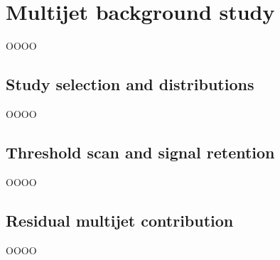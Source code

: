 \chapter{Multijet background study}
\label{app:appendix-1}

OOOO

\section{Study selection and distributions}
\label{heading:Appendix-Appendix1-2}

OOOO

\section{Threshold scan and signal retention}
\label{heading:Appendix-Appendix1-3}

OOOO

\section{Residual multijet contribution}
\label{heading:Appendix-Appendix1-4}

OOOO

